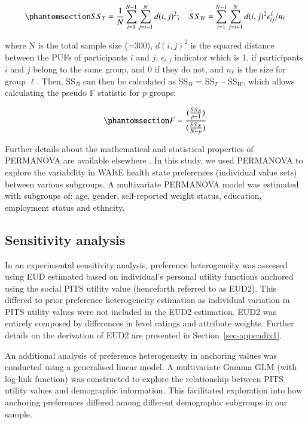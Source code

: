 \documentclass[
  number,
  preprint]{elsarticle}
\begin{document}
\begin{equation}\phantomsection\label{eq-sumsquares}{ 
    SS_{T} = \frac{1}{N}\sum_{i=1}^{N-1}\sum_{j=i+1}^{N}d(i,j)^{2}; \quad SS_{W} = \sum_{i=1}^{N-1}\sum_{j=i+1}^{N}d(i,j)^{2}\epsilon_{ij}^{\ell}/n_{\ell}
}\end{equation}

where N is the total sample size (=300), \(d(i,j)^2\) is the squared
distance between the PUFs of participants \(i\) and \(j\),
\(\epsilon_{i,j}\) indicator which is 1, if participants \(i\) and \(j\)
belong to the same group, and 0 if they do not, and \(n_{\ell}\) is the
size for group \(\ell\). Then, SS\(_B\) can then be calculated as
SS\(_B\) = SS\(_T\) -- SS\(_W\), which allows calculating the pseudo F
statistic for \(p\) groups:

\begin{equation}\phantomsection\label{eq-ssb}{
F= \frac{(\frac{SS_B}{p-1})}{(\frac{SS_W}{N-p})}
}\end{equation}

Further details about the mathematical and statistical properties of
PERMANOVA are available elsewhere
\citep{Schneider2024ExploringLevel, Anderson2017, Anderson2013PERMANOVATesting}.
In this study, we used PERMANOVA to explore the variability in WAItE
health state preferences (individual value sets) between various
subgroups. A multivariate PERMANOVA model was estimated with subgroups
of: age, gender, self-reported weight status, education, employment
status and ethncity.

\subsection{Sensitivity analysis}\label{sensitivity-analysis}

In an experimental sensitivity analysis, preference heterogeneity was
assessed using EUD estimated based on individual's personal utility
functions anchored using the social PITS utility value (henceforth
referred to as EUD2). This differed to prior preference heterogeneity
estimation as individual variation in PITS utility values were not
included in the EUD2 estimation. EUD2 was entirely composed by
differences in level ratings and attribute weights. Further details on
the derivation of EUD2 are presented in Section~\ref{sec-appendix1}.

An additional analysis of preference heterogeneity in anchoring values
was conducted using a generalised linear model. A multivariate Gamma GLM
(with log-link function) was constructed to explore the relationship
between PITS utility values and demographic information. This
facilitated exploration into how anchoring preferences differed among
different demographic subgroups in our sample.
\end{document}
